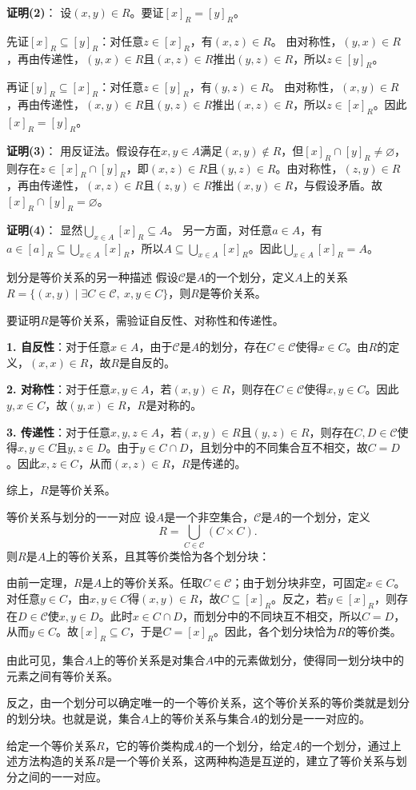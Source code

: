 \documentclass[lang=cn,11pt]{elegantbook}
\begin{document}
\textbf{证明(2)}：
设$(x,y) \in R$。要证$[x]_R = [y]_R$。

先证$[x]_R \subseteq [y]_R$：对任意$z \in [x]_R$，有$(x,z) \in R$。
由对称性，$(y,x) \in R$，再由传递性，$(y,x) \in R$且$(x,z) \in R$推出$(y,z) \in R$，所以$z \in [y]_R$。

再证$[y]_R \subseteq [x]_R$：对任意$z \in [y]_R$，有$(y,z) \in R$。
由对称性，$(x,y) \in R$，再由传递性，$(x,y) \in R$且$(y,z) \in R$推出$(x,z) \in R$，所以$z \in [x]_R$。因此$[x]_R = [y]_R$。

\textbf{证明(3)}：
用反证法。假设存在$x,y \in A$满足$(x,y) \notin R$，但$[x]_R \cap [y]_R \neq \varnothing$，
则存在$z \in [x]_R \cap [y]_R$，即$(x,z) \in R$且$(y,z) \in R$。由对称性，$(z,y) \in R$，再由传递性，$(x,z) \in R$且$(z,y) \in R$推出$(x,y) \in R$，与假设矛盾。故$[x]_R \cap [y]_R = \varnothing$。

\textbf{证明(4)}：
显然$\bigcup_{x\in A} [x]_R \subseteq A$。
另一方面，对任意$a \in A$，有$a \in [a]_R \subseteq \bigcup_{x\in A} [x]_R$，所以$A \subseteq \bigcup_{x\in A} [x]_R$。因此$\bigcup_{x\in A} [x]_R = A$。
\begin{theorem}{划分是等价关系的另一种描述}
    假设$\mathcal{C}$是$A$的一个划分，定义$A$上的关系$R=\{(x,y) \mid \exists C\in\mathcal{C},\ x,y\in C\}$，则$R$是等价关系。
\end{theorem}
要证明$R$是等价关系，需验证自反性、对称性和传递性。

\textbf{1. 自反性}：对于任意$x \in A$，由于$\mathcal{C}$是$A$的划分，存在$C\in\mathcal{C}$使得$x\in C$。由$R$的定义，$(x, x) \in R$，故$R$是自反的。

\textbf{2. 对称性}：对于任意$x, y \in A$，若$(x, y) \in R$，则存在$C\in\mathcal{C}$使得$x,y\in C$。因此$y,x\in C$，故$(y, x) \in R$，$R$是对称的。

\textbf{3. 传递性}：对于任意$x, y, z \in A$，若$(x, y) \in R$且$(y, z) \in R$，则存在$C,D\in\mathcal{C}$使得$x,y\in C$且$y,z\in D$。由于$y\in C\cap D$，且划分中的不同集合互不相交，故$C=D$。因此$x,z\in C$，从而$(x,z)\in R$，$R$是传递的。

综上，$R$是等价关系。
\begin{theorem}{等价关系与划分的一一对应}
设$A$是一个非空集合，$\mathcal{C}$是$A$的一个划分，定义
\[
R=\bigcup_{C\in\mathcal{C}}(C\times C).
\]
则$R$是$A$上的等价关系，且其等价类恰为各个划分块：

由前一定理，$R$是$A$上的等价关系。任取$C\in\mathcal{C}$；由于划分块非空，可固定$x\in C$。对任意$y\in C$，由$x,y\in C$得$(x,y)\in R$，故$C\subseteq[x]_R$。反之，若$y\in[x]_R$，则存在$D\in\mathcal{C}$使$x,y\in D$。此时$x\in C\cap D$，而划分中的不同块互不相交，所以$C=D$，从而$y\in C$。故$[x]_R\subseteq C$，于是$C=[x]_R$。因此，各个划分块恰为$R$的等价类。
    
由此可见，集合$A$上的等价关系是对集合$A$中的元素做划分，使得同一划分块中的元素之间有等价关系。
    
反之，由一个划分可以确定唯一的一个等价关系，这个等价关系的等价类就是划分的划分块。也就是说，集合$A$上的等价关系与集合$A$的划分是一一对应的。
\end{theorem}
给定一个等价关系$R$，它的等价类构成$A$的一个划分，给定$A$的一个划分，通过上述方法构造的关系$R$是一个等价关系，这两种构造是互逆的，建立了等价关系与划分之间的一一对应。
\end{document}
